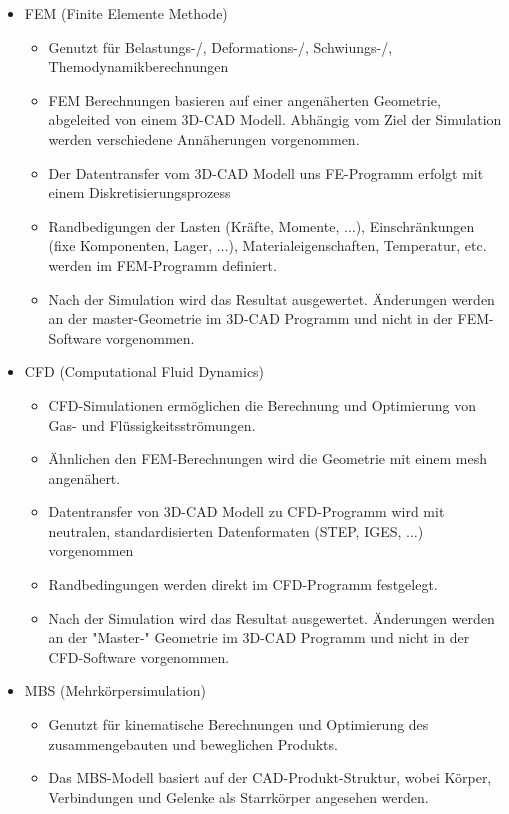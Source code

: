 \documentclass[10pt,a4paper,fleqn]{article}
\begin{document}
\begin{enumerate}
\begin{itemize}
\begin{itemize}
					\end{itemize}
				\item FEM (Finite Elemente Methode)
					\begin{itemize}
						\item Genutzt für Belastungs-/, Deformations-/, Schwiungs-/, Themodynamikberechnungen
						\item FEM Berechnungen basieren auf einer angenäherten Geometrie, abgeleited von einem 3D-CAD Modell. Abhängig vom Ziel der Simulation werden verschiedene Annäherungen vorgenommen.
						\item Der Datentransfer vom 3D-CAD Modell uns FE-Programm erfolgt mit einem Diskretisierungsprozess
						\item Randbedigungen der Lasten (Kräfte, Momente, $\dots$), Einschränkungen (fixe Komponenten, Lager, $\dots$), Materialeigenschaften, Temperatur, etc. werden im FEM-Programm definiert.
						\item Nach der Simulation wird das Resultat ausgewertet. Änderungen werden an der master-Geometrie im 3D-CAD Programm und nicht in der FEM-Software vorgenommen.
					\end{itemize}
				\item CFD (Computational Fluid Dynamics)
					\begin{itemize}
						\item CFD-Simulationen ermöglichen die Berechnung und Optimierung von Gas- und Flüssigkeitsströmungen.
						\item Ähnlichen den FEM-Berechnungen wird die Geometrie mit einem mesh angenähert.
						\item Datentransfer von 3D-CAD Modell zu CFD-Programm wird mit neutralen, standardisierten Datenformaten (STEP, IGES, $\dots$) vorgenommen
						\item Randbedingungen werden direkt im CFD-Programm festgelegt.
						\item Nach der Simulation wird das Resultat ausgewertet. Änderungen werden an der "Master-" Geometrie im 3D-CAD Programm und nicht in der CFD-Software vorgenommen.
					\end{itemize}
				\item MBS (Mehrkörpersimulation)
					\begin{itemize}
						\item Genutzt für kinematische Berechnungen und Optimierung des zusammengebauten und beweglichen Produkts.
						\item Das MBS-Modell basiert auf der CAD-Produkt-Struktur, wobei Körper, Verbindungen und Gelenke als Starrkörper angesehen werden. 

\end{itemize}
\end{itemize}
\end{enumerate}
\end{document}
